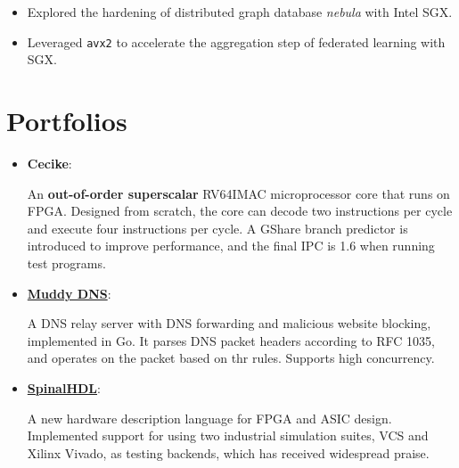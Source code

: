 \documentclass{resume}
\newcommand{\en}[1]{#1}
\newcommand{\zh}[1]{}
\begin{document}
\en{}
\zh{\datedsubsection{\textbf{清华大学信息技术研究院}}{10/2019 -- 04/2020}}
\en{}
\zh{\role{网络安全实验室}{科研实习}}
\begin{itemize}
      \item \en{Explored the hardening of distributed graph database \textit{nebula} with Intel SGX.}
            \zh{探索使用 Intel SGX 技术对分布式图数据库 \textit{nebula} 进行加固。}
      \item \en{Leveraged \texttt{avx2} to accelerate the aggregation step of federated learning with SGX.}
            \zh{利用 \texttt{avx2} 指令集加速了 SGX 技术下联邦学习的模型聚合。}
\end{itemize}

\section{\en{Portfolios}\zh{个人项目}}
\begin{itemize}[parsep=0.25ex]
      \item \textbf{Cecike}:
            \en{
                An \textbf{out-of-order superscalar} RV64IMAC microprocessor core that runs on FPGA.
                Designed from scratch, the core can decode two instructions per cycle and execute four instructions per cycle.
                A GShare branch predictor is introduced to improve performance, and the final IPC is 1.6 when running test programs.
            }
            \zh{
                运行于 FPGA 上的\textbf{乱序超标量} RV64IMAC 微处理器核。
                从零开始设计的乱序双发射处理器架构，每周期最多可以同时解码两条指令，执行四条指令。
                在前端引入 GShare 分支预测器以提升性能，最终运行测试程序时的 IPC 为 1.6。}
      \item \textbf{\href{https://github.com/name1e5s/MuddyDNS}{Muddy DNS}}:
            \en{
                A DNS relay server with DNS forwarding and malicious website blocking, implemented in Go.
                It parses DNS packet headers according to RFC 1035, and operates on the packet based on thr rules.
                Supports high concurrency.
            }
            \zh{支持 DNS 转发及不良网址拦截的中继服务器，使用 Go 实现。按照 RFC 1035 所述规范解析 DNS 包头，根据处理后的结果对 DNS 包进行操作，支持高并发。}
      \item \textbf{\href{https://github.com/SpinalHDL/SpinalHDL}{SpinalHDL}}:
            \en{
                A new hardware description language for FPGA and ASIC design.
                Implemented support for using two industrial simulation suites, 
                VCS and Xilinx Vivado, as testing backends, which has received widespread praise.
            }
            \zh{SpinalHDL 是新一代的硬件语言。为其实现了将 VCS 以及 Xilinx Vivado 两大工业仿真套件作为测试后端，得到广泛好评。}
\end{itemize}
\end{document}
